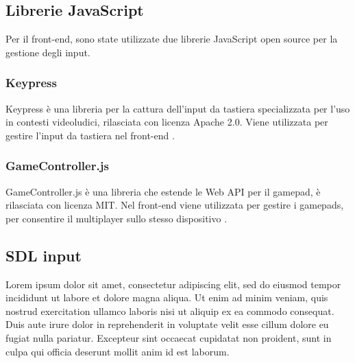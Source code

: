 \subsection{Librerie JavaScript}
Per il front-end, sono state utilizzate due librerie JavaScript open source per la gestione degli input.

\subsubsection{Keypress}
Keypress è una libreria per la cattura dell'input da tastiera specializzata per l'uso in contesti videoludici, rilasciata con licenza Apache 2.0. Viene utilizzata per gestire l'input da tastiera nel front-end \parencite{Keypress}.

\subsubsection{GameController.js}
GameController.js è una libreria che estende le Web API per il gamepad, è rilasciata con licenza MIT. Nel front-end viene utilizzata per gestire i gamepads, per consentire il multiplayer sullo stesso dispositivo \parencite{gameController_js}.


\subsection{SDL input}
Lorem ipsum dolor sit amet, consectetur adipiscing elit, sed do eiusmod tempor incididunt ut labore et dolore magna aliqua. Ut enim ad minim veniam, quis nostrud exercitation ullamco laboris nisi ut aliquip ex ea commodo consequat. Duis aute irure dolor in reprehenderit in voluptate velit esse cillum dolore eu fugiat nulla pariatur. Excepteur sint occaecat cupidatat non proident, sunt in culpa qui officia deserunt mollit anim id est laborum.


